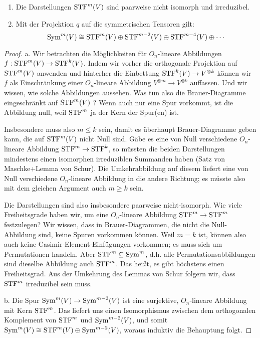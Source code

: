 \begin{theorem}
\begin{enumerate}
\item Die Darstellungen $\operatorname{STF}^m(V)$ sind paarweise nicht isomorph und irreduzibel.
\item Mit der Projektion $q$ auf die symmetrischen Tensoren gilt:
\[\operatorname{Sym}^m(V) \cong \operatorname{STF}^m(V) \oplus \operatorname{STF}^{m-2}(V) \oplus \operatorname{STF}^{m-4}(V) \oplus \cdots\]
\end{enumerate}
\end{theorem}
\begin{proof}
a. Wir betrachten die Möglichkeiten für $O_n$-lineare Abbildungen $f: \operatorname{STF}^m(V) \to \operatorname{STF}^k(V)$. Indem wir vorher die orthogonale Projektion auf $\operatorname{STF}^m(V)$ anwenden und hinterher die Einbettung $\operatorname{STF}^k(V) \to V^{\otimes k}$ können wir $f$ als Einschränkung einer $O_n$-lineare Abbildung $V^{\otimes m} \to V^{\otimes k}$ auffassen. Und wir wissen, wie solche Abbildungen aussehen. Was tun also die Brauer-Diagramme eingeschränkt auf $\operatorname{STF}^m(V)$ ? Wenn auch nur eine Spur vorkommt, ist die Abbildung null, weil $\operatorname{STF}^m$ ja der Kern der Spur(en) ist.

Insbesondere muss also $m\leq k$ sein, damit es überhaupt Brauer-Diagramme geben kann, die auf $\operatorname{STF}^m(V)$ nicht Null sind. Gäbe es eine von Null verschiedene $O_n$-lineare Abbildung $\operatorname{STF}^m\to \operatorname{STF}^k$, so müssten die beiden Darstellungen mindestens einen isomorphen irreduziblen Summanden haben (Satz von Maschke+Lemma von Schur). Die Umkehrabbildung auf diesem liefert eine von Null verschiedene $O_n$-lineare Abbildung in die andere Richtung; es müsste also mit dem gleichen Argument auch $m\geq k$ sein.

Die Darstellungen sind also insbesondere paarweise nicht-isomorph. Wie viele Freiheitsgrade haben wir, um eine $O_n$-lineare Abbildung $\operatorname{STF}^m\to \operatorname{STF}^m$ festzulegen? Wir wissen, dass in Brauer-Diagrammen, die nicht die Null-Abbildung sind, keine Spuren vorkommen können. Weil $m=k$ ist, können also auch keine Casimir-Element-Einfügungen vorkommen; es muss sich um Permutationen handeln. Aber $\operatorname{STF}^m \subseteq\operatorname{Sym}^m$, d.h. alle Permutationsabbildungen sind dieselbe Abbildung auch $\operatorname{STF}^m$. Das heißt, es gibt höchstens einen Freiheitsgrad. Aus der Umkehrung des Lemmas von Schur folgern wir, dass $\operatorname{STF}^m$ irreduzibel sein muss.

\medbreak
b. Die Spur $\operatorname{Sym}^m(V) \to \operatorname{Sym}^{m-2}(V)$ ist eine surjektive, $O_n$-lineare Abbildung mit Kern $\operatorname{STF}^m$. Das liefert uns einen Isomorphismus zwischen dem orthogonalen Komplement von $\operatorname{STF}^m$ und $\operatorname{Sym}^{m-2}(V)$, und somit $\operatorname{Sym}^m(V) \cong \operatorname{STF}^m(V) \oplus \operatorname{Sym}^{m-2}(V)$, woraus induktiv die Behauptung folgt.
\end{proof}